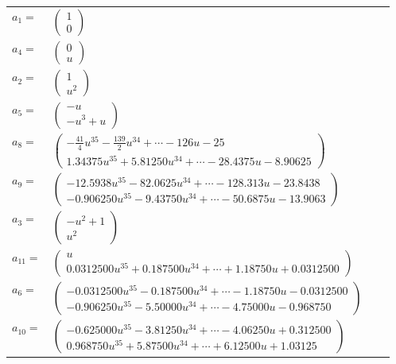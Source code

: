 \documentclass[1p]{elsarticle_modified}
\theoremstyle{definition}
\begin{document}
\begin{tabular}{m{7pt} m{180pt} m{7pt} m{180pt} }
\flushright $a_{1}=$&$\begin{pmatrix}1\\0\end{pmatrix}$ \\
\flushright $a_{4}=$&$\begin{pmatrix}0\\u\end{pmatrix}$ \\
\flushright $a_{2}=$&$\begin{pmatrix}1\\u^2\end{pmatrix}$ \\
\flushright $a_{5}=$&$\begin{pmatrix}- u\\- u^3+u\end{pmatrix}$ \\
\flushright $a_{8}=$&$\begin{pmatrix}-\frac{41}{4} u^{35}-\frac{139}{2} u^{34}+\cdots-126 u-25\\1.34375 u^{35}+5.81250 u^{34}+\cdots-28.4375 u-8.90625\end{pmatrix}$ \\
\flushright $a_{9}=$&$\begin{pmatrix}-12.5938 u^{35}-82.0625 u^{34}+\cdots-128.313 u-23.8438\\-0.906250 u^{35}-9.43750 u^{34}+\cdots-50.6875 u-13.9063\end{pmatrix}$ \\
\flushright $a_{3}=$&$\begin{pmatrix}- u^2+1\\u^2\end{pmatrix}$ \\
\flushright $a_{11}=$&$\begin{pmatrix}u\\0.0312500 u^{35}+0.187500 u^{34}+\cdots+1.18750 u+0.0312500\end{pmatrix}$ \\
\flushright $a_{6}=$&$\begin{pmatrix}-0.0312500 u^{35}-0.187500 u^{34}+\cdots-1.18750 u-0.0312500\\-0.906250 u^{35}-5.50000 u^{34}+\cdots-4.75000 u-0.968750\end{pmatrix}$ \\
\flushright $a_{10}=$&$\begin{pmatrix}-0.625000 u^{35}-3.81250 u^{34}+\cdots-4.06250 u+0.312500\\0.968750 u^{35}+5.87500 u^{34}+\cdots+6.12500 u+1.03125\end{pmatrix}$ \\

\end{tabular}
\end{document}
